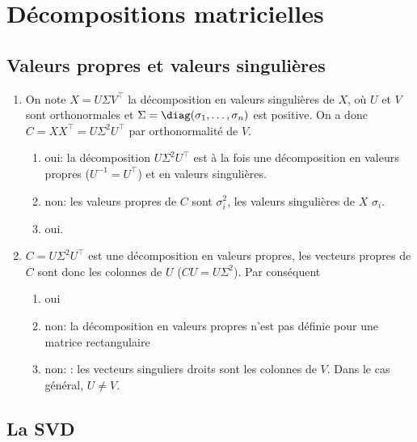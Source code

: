 \documentclass{article}
\begin{document}
	
	\section{Décompositions matricielles}
	
	\subsection{Valeurs propres et valeurs singulières}
	
	\begin{enumerate}
		\item On note $X = U\Sigma V^\top$ la décomposition en valeurs singulières de $X$, où $U$ et $V$ sont orthonormales et $\Sigma = \diag(\sigma_1,\ldots,\sigma_n)$ est positive. On a donc $C = XX^\top = U \Sigma^2 U^\top$ par orthonormalité de $V$.
		\begin{enumerate}
			\item  oui: la décomposition $U \Sigma^2 U^\top$ est à la fois une décomposition en valeurs propres ($U^{-1} = U^\top$) et en valeurs singulières.
			\item non: les valeurs propres de $C$ sont $\sigma_i^2$, les valeurs singulières de $X$ $\sigma_i$.
			\item oui.
		\end{enumerate}
		
		\item $C = U\Sigma^2 U^\top$ est une décomposition en valeurs propres, les vecteurs propres de $C$ sont donc les colonnes de $U$ ($CU = U\Sigma^2$). Par conséquent
		\begin{enumerate}
			\item  oui
			
			\item non: la décomposition en valeurs propres n'est pas définie pour une matrice rectangulaire
			
			\item non: : les vecteurs singuliers droits sont les colonnes de $V$. Dans le cas général, $U \neq V$.
		\end{enumerate}
	\end{enumerate}

\subsection{La SVD}
\end{document}
